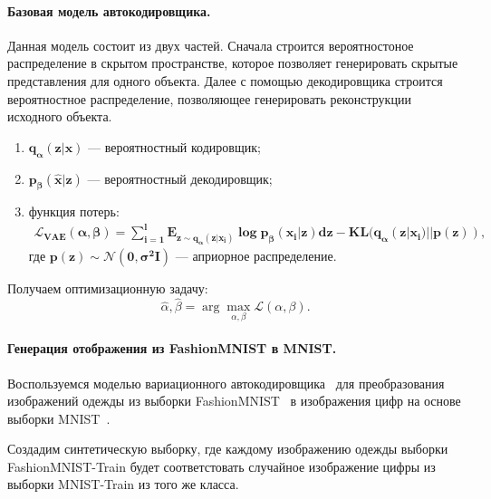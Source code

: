 \paragraph{Базовая модель автокодировщика.} Данная модель состоит из двух частей. Сначала строится вероятностоное распределение в скрытом пространстве, которое позволяет генерировать скрытые представления для одного объекта. Далее с помощью декодировщика строится вероятностное распределение, позволяющее генерировать реконструкции исходного объекта.
\begin{enumerate}
    \item $\mathbf{q_{\alpha}(z|x)}$ --- вероятностный кодировщик;
    \item $\mathbf{p_{\beta}(\hat{x}|z)}$ --- вероятностный декодировщик;
    \item функция потерь:
    \[
    \begin{aligned}
    \mathbf{\mathcal{L}_{\text{VAE}}(\alpha, \beta)=\sum\limits_{i=1}^{l}\text{E}_{z\sim q_{\alpha}(z|x_{i})}\log{p_{\beta}(x_{i}|z)}dz-\text{KL}(q_{\alpha}(z|x_{i})||p(z))},
    \end{aligned}
    \]
    где
    $\mathbf{p(z)\sim \mathcal{N}(0,\sigma^{2}\mathbf{I})}$ 
    --- априорное распределение.
\end{enumerate}
Получаем оптимизационную задачу:
$$\hat{\alpha}, \hat{\beta} = \arg\max_{\alpha, \beta} \mathcal{L}(\alpha, \beta).$$

\newpage
\paragraph{Генерация отображения из FashionMNIST в MNIST.}
Воспользуемся моделью вариационного автокодировщика~\cite{VAE} для преобразования изображений одежды из выборки FashionMNIST~\cite{FMNIST} в изображения цифр на основе выборки MNIST~\cite{MNIST}.

Создадим синтетическую выборку, где каждому изображению одежды выборки FashionMNIST-Train будет соответстовать случайное изображение цифры из выборки MNIST-Train из того же класса.

